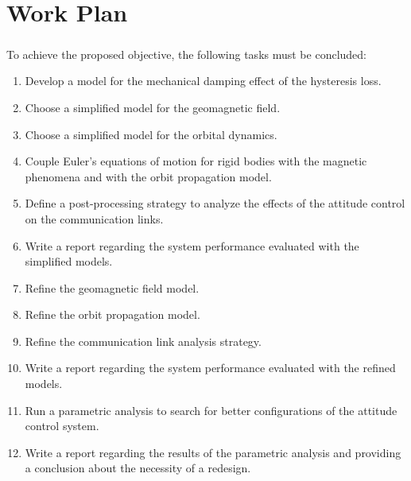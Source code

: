 %
%
%
%
%

%
%
%
%
%
%

\chapter{Work Plan} \label{ch:work-plan}

\paragraph{}
\indent 
   To achieve the proposed objective, the following tasks must be concluded:
   
   \begin{enumerate}
   	\item Develop a model for the mechanical damping effect of the hysteresis loss.
   	\item Choose a simplified model for the geomagnetic field.
   	\item Choose a simplified model for the orbital dynamics.
   	\item Couple Euler's equations of motion for rigid bodies with the magnetic phenomena and with the orbit propagation model.
   	\item Define a post-processing strategy to analyze the effects of the attitude control on the communication links.
   	\item Write a report regarding the system performance evaluated with the simplified models.
   	\item Refine the geomagnetic field model.
   	\item Refine the orbit propagation model.
   	\item Refine the communication link analysis strategy.
   	\item Write a report regarding the system performance evaluated with the refined models.
   	\item Run a parametric analysis to search for better configurations of the attitude control system.
   	\item Write a report regarding the results of the parametric analysis and providing a conclusion about the necessity of a redesign.
   \end{enumerate}
